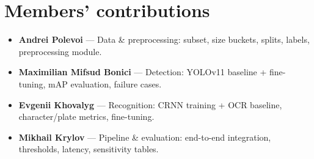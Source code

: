 \documentclass[10pt]{article}
\begin{document}
\section{Members' contributions}

\begin{itemize}
\setlength{\itemsep}{1pt}
\item \textbf{Andrei Polevoi} --- Data \& preprocessing: subset, size buckets, splits, labels, preprocessing module.
\item \textbf{Maximilian Mifsud Bonici} --- Detection: YOLOv11 baseline + fine-tuning, mAP evaluation, failure cases.
\item \textbf{Evgenii Khovalyg} --- Recognition: CRNN training + OCR baseline, character/plate metrics, fine-tuning.
\item \textbf{Mikhail Krylov} --- Pipeline \& evaluation: end-to-end integration, thresholds, latency, sensitivity tables.
\end{itemize}
\end{document}
